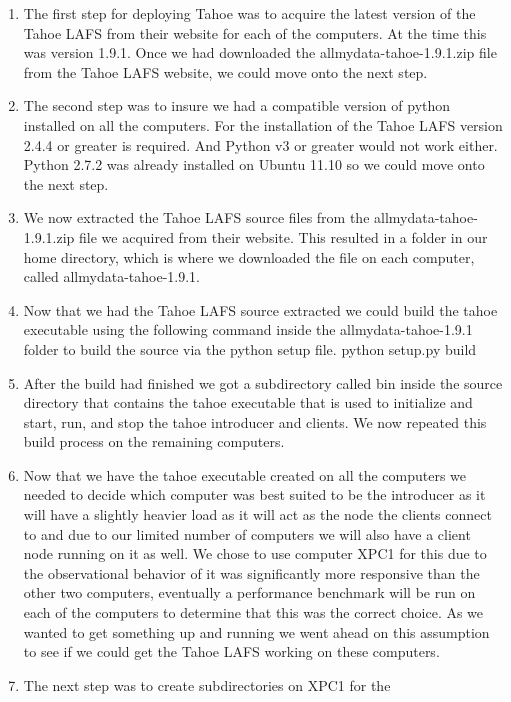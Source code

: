 \documentclass[11pt]{article}
\begin{document}
\begin{enumerate}
\item The first step for deploying Tahoe was to acquire the latest
  version of the Tahoe LAFS from their website for each of the
  computers. \cite{tahoe-lafs.org} At the time this was version
  1.9.1. Once we had downloaded the allmydata-tahoe-1.9.1.zip file
  from the Tahoe LAFS website, we could move onto the next step.
\item The second step was to insure we had a compatible version of
  python installed on all the computers. \cite{python.org} For the
  installation of the Tahoe LAFS version 2.4.4 or greater is
  required. And Python v3 or greater would not work either. Python
  2.7.2 was already installed on Ubuntu 11.10 so we could move onto
  the next step.
\item We now extracted the Tahoe LAFS source files from the
  allmydata-tahoe-1.9.1.zip file we acquired from their website. This
  resulted in a folder in our home directory, which is where we
  downloaded the file on each computer, called allmydata-tahoe-1.9.1.
\item Now that we had the Tahoe LAFS source extracted we could build
  the tahoe executable using the following command inside the
  allmydata-tahoe-1.9.1 folder to build the source via the python
  setup file.  \subitem python setup.py build
\item After the build had finished we got a subdirectory called bin
  inside the source directory that contains the tahoe executable that
  is used to initialize and start, run, and stop the tahoe introducer
  and clients. We now repeated this build process on the remaining
  computers.
\item Now that we have the tahoe executable created on all the
  computers we needed to decide which computer was best suited to be
  the introducer as it will have a slightly heavier load as it will
  act as the node the clients connect to and due to our limited number
  of computers we will also have a client node running on it as
  well. We chose to use computer XPC1 for this due to the
  observational behavior of it was significantly more responsive than
  the other two computers, eventually a performance benchmark will be
  run on each of the computers to determine that this was the correct
  choice. As we wanted to get something up and running we went ahead
  on this assumption to see if we could get the Tahoe LAFS working on
  these computers.
\item The next step was to create subdirectories on XPC1 for the

\end{enumerate}
\end{document}
